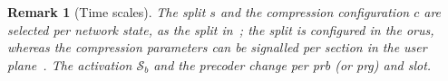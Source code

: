 \documentclass[10pt, final, journal, letterpaper, twocolumn]{IEEEtran}
\newtheorem{remark}{Remark}
\begin{document}
\begin{remark}[Time scales]\label{rem:timescales}
The split $s$ and the compression configuration $c$ are selected per network state, as the split in~\cite{girycki2024eucnc}; the split is configured in the \glspl{oru}, whereas the compression parameters can be signalled per section in the user plane~\cite{oran_cus_v22}. The activation $\mathcal{S}_b$ and the precoder change per \gls{prb} (or \gls{prg}) and slot.
\end{remark}

\printbibliography
\end{document}

